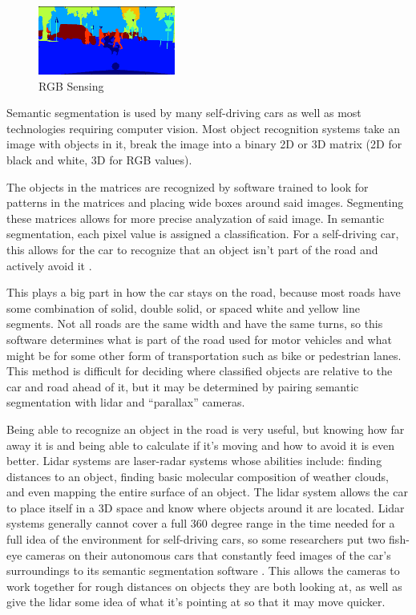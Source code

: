 \documentclass[12pt]{article}
\begin{document}
	\begin{figure}
		\begin{center}
			\includegraphics[width=0.4\textwidth]{5vision-2a}
		\end{center}
		\caption{RGB Sensing \cite{eRoad} }
	\end{figure}


Semantic segmentation is used by many self-driving cars as well as most technologies requiring computer vision. Most object recognition systems take an image with objects in it, break the image into a binary 2D or 3D matrix (2D for black and white, 3D for RGB values)\cite{eRoad}.\newline


\quad The objects in the matrices are recognized by software trained to look for patterns in the matrices and placing wide boxes around said images. Segmenting these matrices allows for more precise analyzation of said image. In semantic segmentation, each pixel value is assigned a classification. For a self-driving car, this allows for the car to recognize that an object isn’t part of the road and actively avoid it \cite{MatrixImages}. \newline
 
 This plays a big part in how the car stays on the road, because most roads have some combination of solid, double solid, or spaced white and yellow line segments. Not all roads are the same width and have the same turns, so this software determines what is part of the road used for motor vehicles and what might be for some other form of transportation such as bike or pedestrian lanes. This method is difficult for deciding where classified objects are relative to the car and road ahead of it, but it may be determined by pairing semantic segmentation with lidar and “parallax” cameras.\newline
 
 Being able to recognize an object in the road is very useful, but knowing how far away it is and being able to calculate if it’s moving and how to avoid it is even better. Lidar systems are laser-radar systems whose abilities include: finding distances to an object, finding basic molecular composition of weather clouds, and even mapping the entire surface of an object. The lidar system allows the car to place itself in a 3D space and know where objects around it are located. Lidar systems generally cannot cover a full 360 degree range in the time needed for a full idea of the environment for self-driving cars, so some researchers put two fish-eye cameras on their autonomous cars that constantly feed images of the car’s surroundings to its semantic segmentation software \cite{eRoad}. This allows the cameras to work together for rough distances on objects they are both looking at, as well as give the lidar some idea of what it’s pointing at so that it may move quicker. \newline
 
\end{document}
